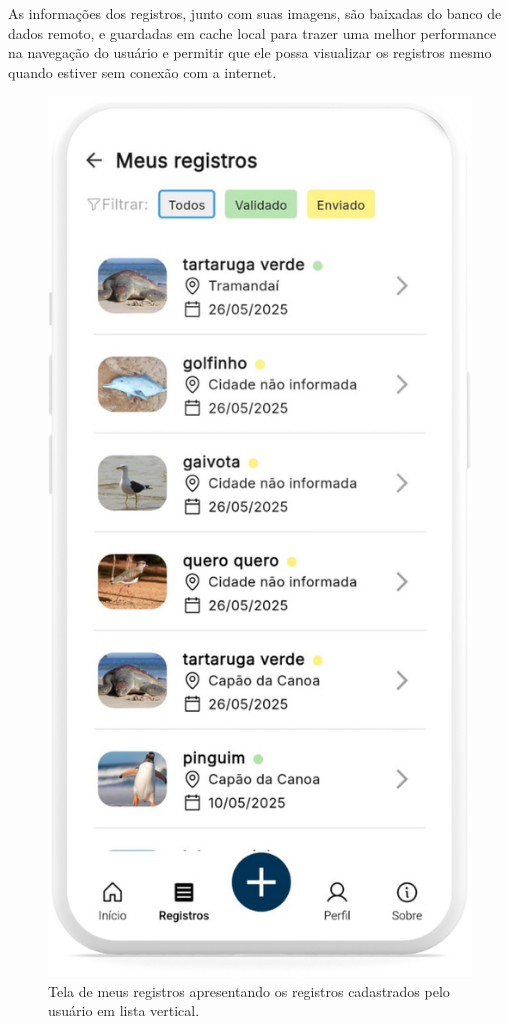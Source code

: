 As informações dos registros, junto com suas imagens, são baixadas do banco de dados remoto, e 
guardadas em cache local para trazer uma melhor performance na navegação do usuário e permitir que 
ele possa visualizar os registros mesmo quando estiver sem conexão com a internet.

\begin{figure}[H]
    \centering
    \includegraphics[height=0.72\textheight]{imagens/sistema/device_frame/meusregistrosTodos.png}
    \caption{Tela de meus registros apresentando os registros cadastrados pelo usuário em lista vertical.}
    \label{fig:meus-registros}
\end{figure}

